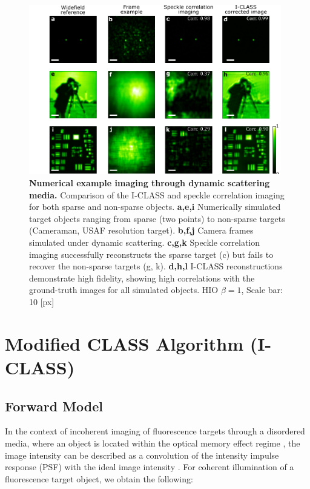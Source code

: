 \documentclass[pdflatex,sn-mathphys-num,Numbered]{sn-jnl}%
\theoremstyle{thmstyleone}%
\theoremstyle{thmstyletwo}%
\theoremstyle{thmstylethree}%
\begin{document}
\begin{figure}[hbt!]
	\centering
	\includegraphics [width=0.98\textwidth,]
	{supp_figures/figure_S3.pdf}
         \renewcommand{\thefigure}{S4}
    \caption{\textbf{Numerical example imaging through dynamic scattering media.} 
    Comparison of the I-CLASS and speckle correlation imaging for both sparse and non-sparse objects. \textbf{a,e,i} Numerically simulated target objects ranging from sparse (two points) to non-sparse targets (Cameraman, USAF resolution target). \textbf{b,f,j} Camera frames simulated under dynamic scattering. \textbf{c,g,k} Speckle correlation imaging successfully reconstructs the sparse target (c) but fails to recover the non-sparse targets (g, k). \textbf{d,h,l} I-CLASS reconstructions demonstrate high fidelity, showing high correlations with the ground-truth images for all simulated objects.  HIO $\beta = 1$, Scale bar: 10 [px]}
        \label{fig_S3}
\end{figure} 



\newpage

\section{Modified CLASS Algorithm (I-CLASS)}
\subsection*{Forward Model}

In the context of incoherent imaging of fluorescence targets through a disordered media, where an object is located within the optical memory effect regime \cite{feng1988correlations}, the image intensity can be described as a convolution of the intensity impulse response (PSF) with the ideal image intensity \cite{goodman2005introduction}.
For coherent illumination of a fluorescence target object, we obtain the following:
\end{document}
